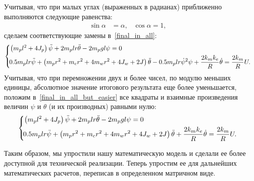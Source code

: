 \documentclass[12pt,a4paper,openany]{extarticle}
\begin{document}
Учитывая, что при малых углах (выраженных в радианах) приближенно выполняются следующие равенства:
\begin{align}
	\sin\alpha &= \alpha, & \cos\alpha = 1,
\end{align}
сделаем соответствующие замены в~\eqref{final_in_all}:
\begin{equation}\label{final_in_all_but_easier}
	\left\{  
	\begin{aligned}
		\!&\left(m_pl^2 + 4J_p\right)\ddot\psi + 2m_plr\ddot\theta - 2m_pgl\psi = 0\\
		\!&0.5m_plr\ddot\psi + \left(m_pr^2 + m_cr^2 + 4m_wr^2 + 4J_w + 2J\right)\ddot\theta - 	
			0.5m_plr\dot\psi^2\psi + \frac{2k_mk_e}{R}\dot\theta = \frac{2k_m}{R}U\ldotp
	\end{aligned}   
	\right.
\end{equation}
Учитывая, что при перемножении двух и более чисел, по модулю меньших единицы, абсолютное значение итогового результата еще более уменьшается, положим в~\eqref{final_in_all_but_easier} все квадраты и взаимные произведения величин $\psi$ и $\theta$ (и их производных) равными нулю:
\begin{equation}\label{final_in_all_but_the_easiest}
	\left\{  
	\begin{aligned}
		\!&\left(m_pl^2 + 4J_p\right)\ddot\psi + 2m_plr\ddot\theta - 2m_pgl\psi = 0\\
		\!&0.5m_plr\ddot\psi + \left(m_pr^2 + m_cr^2 + 4m_wr^2 + 4J_w + 2J\right)\ddot\theta	
			 + \frac{2k_mk_e}{R}\dot\theta = \frac{2k_m}{R}U\ldotp
	\end{aligned}   
	\right.
\end{equation}

Таким образом, мы упростили нашу математическую модель и сделали ее более доступной для технической реализации.
Теперь упростим ее для дальнейших математических расчетов, переписав в определенном матричном виде.
\end{document}
